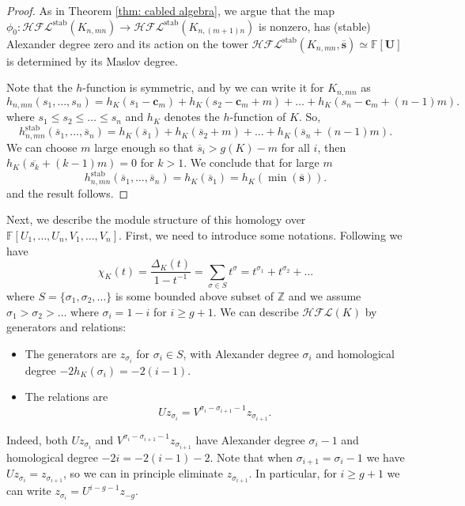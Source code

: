 \documentclass{amsart}
\newcommand{\F}{\mathbb{F}}
\newcommand{\cHFL}{\mathcal{H\!F\! L}}
\newcommand{\UU}{\mathbf{U}}
\newcommand{\cc}{\mathbf{c}}
\newcommand{\stab}{\mathrm{stab}}
\renewcommand{\ss}{\mathbf{s}}
\begin{document}
\begin{proof}
As in Theorem \ref{thm: cabled algebra}, we argue that the map $\phi_0:\cHFL^{\stab}(K_{n,mn})\to \cHFL^{\stab}(K_{n,(m+1)n})$ is nonzero, has (stable) Alexander degree zero and its action on the tower $\cHFL^{\stab}(K_{n,mn},\overline{\ss})\simeq \F[\UU]$ is determined by its Maslov degree.

Note that the $h$-function is symmetric, and by \cite[Theorem 4.3]{GH} we can write it for $K_{n,mn}$ as
$$
h_{n,mn}(s_1,\ldots,s_n)=h_K(s_1-\cc_m)+h_K(s_2-\cc_m+m)+\ldots+h_K(s_n-\cc_m+(n-1)m).
$$ 
where $s_1\le s_2\le \ldots\le s_n$ and $h_K$ denotes the $h$-function of $K$. So,
$$
h_{n,mn}^{\stab}(\overline{s}_1,\ldots,\overline{s}_n)=h_K(\overline{s}_1)+h_K(\overline{s}_2+m)+\ldots+h_K(\overline{s}_n+(n-1)m).
$$ 
We can choose $m$ large enough so that $\overline{s}_i>g(K)-m$ for all $i$, then $h_K(\overline{s_k}+(k-1)m)=0$ for $k>1$. We conclude that for large $m$
$$
h_{n,mn}^{\stab}(\overline{s}_1,\ldots,\overline{s}_n)=h_K(\overline{s}_1)=h_K(\min(\overline{\ss})).
$$
and the result follows.
\end{proof}

Next, we describe the module structure of this homology over $\F[U_1,\ldots,U_n,V_1,\ldots,V_n]$.
First, we need to introduce some notations.
Following \cite{OSlens} we have
$$
\chi_K(t)=\frac{\Delta_K(t)}{1-t^{-1}}=\sum_{\sigma\in S}t^{\sigma}=t^{\sigma_1}+t^{\sigma_2}+\ldots
$$
where $S=\{\sigma_1,\sigma_2,\ldots\}$ is some bounded above subset of $\mathbb{Z}$ and we assume $\sigma_1>\sigma_2>\ldots$ where $\sigma_i=1-i$ for $i\ge g+1$. We can describe $\cHFL(K)$ by generators and relations: 
\begin{itemize}
\item The generators are $z_{\sigma_i}$ for $\sigma_i\in S$, with Alexander degree $\sigma_i$ and homological degree $-2h_K(\sigma_i)=-2(i-1)$.
\item The relations are 
\begin{equation}
\label{eq: zigzag}
Uz_{\sigma_i}=V^{\sigma_i-\sigma_{i+1}-1}z_{\sigma_{i+1}}.
\end{equation}
\end{itemize}
Indeed, both $Uz_{\sigma_i}$ and $V^{\sigma_i-\sigma_{i+1}-1}z_{\sigma_{i+1}}$ have Alexander degree $\sigma_i-1$ and homological degree $-2i=-2(i-1)-2$. Note that when $\sigma_{i+1}=\sigma_i-1$  we have $Uz_{\sigma_i}=z_{\sigma_{i+1}}$, so we can in principle eliminate $z_{\sigma_{i+1}}$. In particular, for $i\ge g+1$ we can write $z_{\sigma_i}=U^{i-g-1}z_{-g}$.
\end{document}
